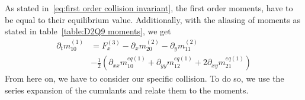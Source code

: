 \documentclass{article}
\begin{document}
As stated in~\eqref{eq:first order collision invariant}, the first order moments, have to be equal to their equilibrium value. Additionally, with the aliasing of moments as stated in table~\ref{table:D2Q9 moments}, we get
\begin{equation}
  \begin{aligned}
  \partial_t m_{10}^{(1)}
   & =
    F_x^{(3)}
    - \partial_x m_{20}^{(2)} - \partial_y m_{11}^{(2)} \\
    &
    - \frac{1}{2} \left(\partial_{xx} m_{10}^{eq(1)} + \partial_{yy} m_{12}^{eq(1)} + 2\partial_{xy} m_{21}^{eq(1)}\right)
  \end{aligned}
\end{equation}
From here on, we have to consider our specific collision. To do so, we use the series expansion of the cumulants and relate them to the moments.
\end{document}
